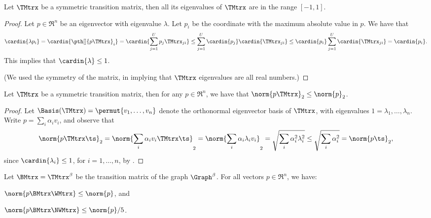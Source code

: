 \begin{lemma}
    Let $\TMtrx$ be a symmetric transition matrix, then all its
    eigenvalues of $\TMtrx$ are in the range $[-1,1]$.
\end{lemma}

\begin{proof}
    Let $p \in \Re^n$ be an eigenvector with eigenvalue $\lambda$. Let
    $p_i$ be the coordinate with the maximum absolute value in $p$. We
    have that
    \begin{equation*}
        \cardin{\bigl.\lambda p_i}%
        =%
        \cardin{\Bigl.\pth[]{\bigl. p\TMtrx}_i}%
        =%
        \cardin{\sum_{j=1}^U p_j \TMtrx_{ji} }%
        \leq%
        \sum_{j=1}^U \cardin{p_j} \cardin{ \TMtrx_{ji} }%
        \leq%
        \cardin{p_i} \sum_{j=1}^U \cardin{ \TMtrx_{ji} }%
        =%
        \cardin{\bigl. p_i}.
    \end{equation*}
    This implies that $\cardin{\lambda} \leq 1$.
    
    (We used the symmetry of the matrix, in implying that $\TMtrx$
    eigenvalues are all real numbers.)
\end{proof}

\begin{lemma}
    Let $\TMtrx$ be a symmetric transition matrix, then for any $p \in
    \Re^n$, we have that $\norm{p \TMtrx}_2 \leq \norm{ p }_2$.
\end{lemma}

\begin{proof}
    Let $\Basis(\TMtrx)= \permut{v_1,\ldots, v_n}$ denote the
    orthonormal eigenvector basis of $\TMtrx$, with eigenvalues
    $1=\lambda_1, \ldots, \lambda_n$. Write $p = \sum_i \alpha_i v_i$,
    and observe that
    \begin{equation*}
        \norm{ \bigl. p \TMtrx \ts}_2%
        =%
        \norm{\sum_i \alpha_i v_i \TMtrx \ts}_2%
        =%
        \norm{\sum_i \alpha_i \lambda_i v_i }_2%
        =%
        \sqrt{\sum_i \alpha_i^2 \lambda_i^2}%
        \leq %
        \sqrt{\sum_i \alpha_i^2 }%
        =%
        \norm{\bigl.p \ts}_2,
    \end{equation*}
    since $\cardin{\lambda_i} \leq 1$, for $i=1,\ldots, n$, by
    .
\end{proof}


\begin{lemma}
    Let $\BMtrx= \TMtrx^\beta$ be the transition matrix of the graph
    $\Graph^\beta$.  For all vectors $p \in \Re^n$, we have:
    \begin{compactenumi}
        \item
        $\norm{ p \BMtrx \WMtrx} \leq \norm{p}$, and
        \smallskip%
        \item
        $\norm{\bigl. p \smash{\BMtrx \NWMtrx } } \leq \norm{p}/5$.
    \end{compactenumi}
\end{lemma}

